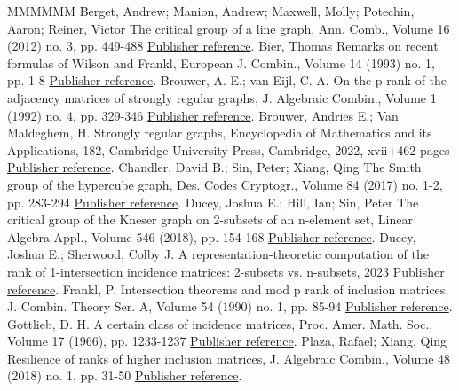 \documentclass[11pt]{article}
\theoremstyle{definition}
\numberwithin{equation}{section}
\numberwithin{equation}{section}
\begin{document}
\begin{thebibliography}{MMMMMM}
 Berget, Andrew; Manion, Andrew; Maxwell, Molly; Potechin, Aaron; Reiner, Victor The critical group of a line graph, Ann. Comb., Volume 16 (2012) no. 3, pp. 449-488 \href{https://alco.centre-mersenne.org/articles/10.5802/alco.406/#line}{Publisher reference}.
 Bier, Thomas Remarks on recent formulas of Wilson and Frankl, European J. Combin., Volume 14 (1993) no. 1, pp. 1-8 \href{https://alco.centre-mersenne.org/articles/10.5802/alco.406/#bier}{Publisher reference}.
 Brouwer, A. E.; van Eijl, C. A. On the p-rank of the adjacency matrices of strongly regular graphs, J. Algebraic Combin., Volume 1 (1992) no. 4, pp. 329-346 \href{https://alco.centre-mersenne.org/articles/10.5802/alco.406/#brouwer:prank}{Publisher reference}.
 Brouwer, Andries E.; Van Maldeghem, H. Strongly regular graphs, Encyclopedia of Mathematics and its Applications, 182, Cambridge University Press, Cambridge, 2022, xvii+462 pages \href{https://alco.centre-mersenne.org/articles/10.5802/alco.406/#brouwer-vanmaldeghem}{Publisher reference}.
 Chandler, David B.; Sin, Peter; Xiang, Qing The Smith group of the hypercube graph, Des. Codes Cryptogr., Volume 84 (2017) no. 1-2, pp. 283-294 \href{https://alco.centre-mersenne.org/articles/10.5802/alco.406/#hypercube}{Publisher reference}.
 Ducey, Joshua E.; Hill, Ian; Sin, Peter The critical group of the Kneser graph on 2-subsets of an n-element set, Linear Algebra Appl., Volume 546 (2018), pp. 154-168 \href{https://alco.centre-mersenne.org/articles/10.5802/alco.406/#duceysinhill}{Publisher reference}.
 Ducey, Joshua E.; Sherwood, Colby J. A representation-theoretic computation of the rank of 1-intersection incidence matrices: 2-subsets vs. n-subsets, 2023 \href{https://alco.centre-mersenne.org/articles/10.5802/alco.406/#ds}{Publisher reference}.
 Frankl, P. Intersection theorems and mod p rank of inclusion matrices, J. Combin. Theory Ser. A, Volume 54 (1990) no. 1, pp. 85-94 \href{https://alco.centre-mersenne.org/articles/10.5802/alco.406/#frankl}{Publisher reference}.
 Gottlieb, D. H. A certain class of incidence matrices, Proc. Amer. Math. Soc., Volume 17 (1966), pp. 1233-1237 \href{https://alco.centre-mersenne.org/articles/10.5802/alco.406/#gottlieb}{Publisher reference}.
 Plaza, Rafael; Xiang, Qing Resilience of ranks of higher inclusion matrices, J. Algebraic Combin., Volume 48 (2018) no. 1, pp. 31-50 \href{https://alco.centre-mersenne.org/articles/10.5802/alco.406/#resilience}{Publisher reference}.

\end{thebibliography}
\end{document}
